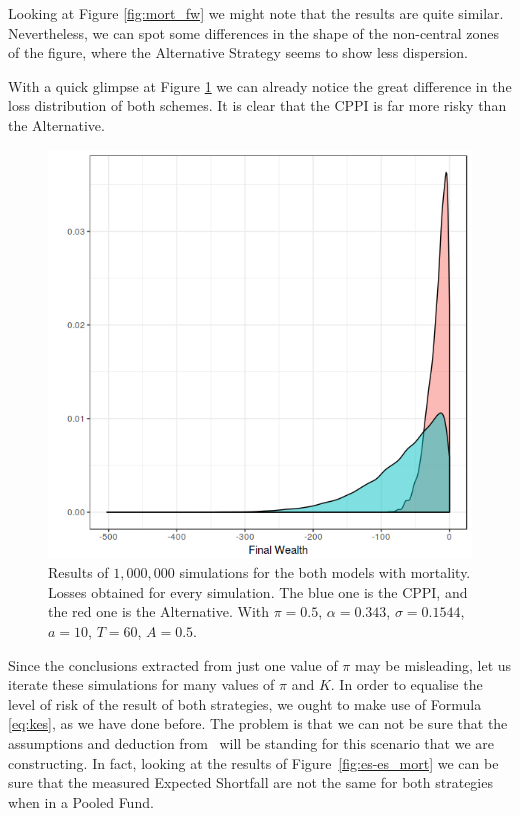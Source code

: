 Looking at Figure \ref{fig:mort_fw} we might note that the results are quite similar. Nevertheless, we can spot some differences in the shape of the non-central zones of the figure, where the Alternative Strategy seems to show less dispersion.

With a quick glimpse at Figure \ref{fig:mort_loss} we can already notice the great difference in the loss distribution of both schemes. It is clear that the CPPI is far more risky than the Alternative.

\begin{figure}[h]
    \centering
    \includegraphics[scale=0.75]{./images/loss_both_mort.png}
    \caption{Results of $1,000,000$ simulations for the both models with mortality. Losses obtained for every simulation. The blue one is the CPPI, and the red one is the Alternative. With $\pi = 0.5$, $\alpha = 0.343$, $\sigma = 0.1544$, $a = 10$, $T = 60$, $A = 0.5$.}
    \label{fig:mort_loss}
\end{figure}

Since the conclusions extracted from just one value of $\pi$ may be misleading, let us iterate these simulations for many values of $\pi$ and $K$. In order to equalise the level of risk of the result of both strategies, we ought to make use of Formula \ref{eq:kes}, as we have done before. The problem is that we can not be sure that the assumptions and deduction from~\cite{a:guillen-optimisation} will be standing for this scenario that we are constructing. In fact, looking at the results of Figure~\ref{fig:es-es_mort} we can be sure that the measured Expected Shortfall are not the same for both strategies when in a Pooled Fund.

